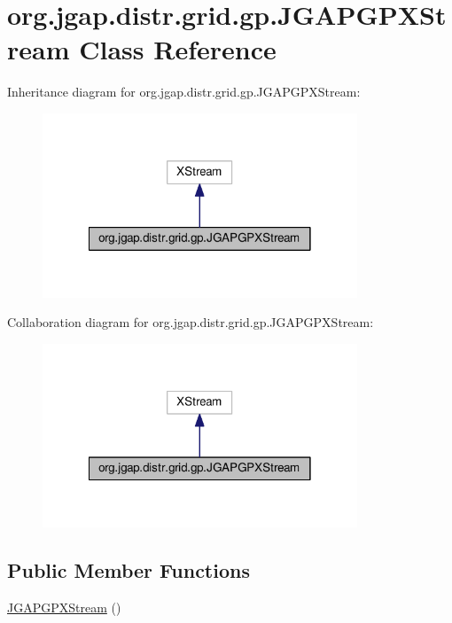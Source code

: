 \hypertarget{classorg_1_1jgap_1_1distr_1_1grid_1_1gp_1_1_j_g_a_p_g_p_x_stream}{\section{org.\-jgap.\-distr.\-grid.\-gp.\-J\-G\-A\-P\-G\-P\-X\-Stream Class Reference}
\label{classorg_1_1jgap_1_1distr_1_1grid_1_1gp_1_1_j_g_a_p_g_p_x_stream}
}


Inheritance diagram for org.\-jgap.\-distr.\-grid.\-gp.\-J\-G\-A\-P\-G\-P\-X\-Stream\-:
\nopagebreak
\begin{figure}[H]
\begin{center}
\leavevmode
\includegraphics[width=266pt]{classorg_1_1jgap_1_1distr_1_1grid_1_1gp_1_1_j_g_a_p_g_p_x_stream__inherit__graph}
\end{center}
\end{figure}


Collaboration diagram for org.\-jgap.\-distr.\-grid.\-gp.\-J\-G\-A\-P\-G\-P\-X\-Stream\-:
\nopagebreak
\begin{figure}[H]
\begin{center}
\leavevmode
\includegraphics[width=266pt]{classorg_1_1jgap_1_1distr_1_1grid_1_1gp_1_1_j_g_a_p_g_p_x_stream__coll__graph}
\end{center}
\end{figure}
\subsection*{Public Member Functions}
\begin{DoxyCompactItemize}
\item 
\hyperlink{classorg_1_1jgap_1_1distr_1_1grid_1_1gp_1_1_j_g_a_p_g_p_x_stream_a15a34c001e70ea902a8e342d6473e330}{J\-G\-A\-P\-G\-P\-X\-Stream} ()
\end{DoxyCompactItemize}
